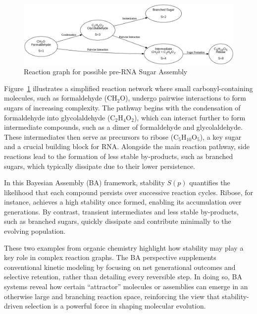 \documentclass[entropy,article,submit,pdftex,moreauthors]{Definitions/mdpi}
\begin{document}
\begin{figure}[h]
    \centering
    \includegraphics[width=1\textwidth,height=0.4\textwidth]{abc_prerna.png}
    \caption{Reaction graph for possible pre-RNA Sugar Assembly}
    \label{fig:abc_prerna}
\end{figure}

Figure~\ref{fig:abc_prerna} illustrates a simplified reaction network where small carbonyl-containing molecules, such as formaldehyde (CH$_2$O), undergo pairwise interactions to form sugars of increasing complexity. The pathway begins with the condensation of formaldehyde into glycolaldehyde (C$_2$H$_4$O$_2$), which can interact further to form intermediate compounds, such as a dimer of formaldehyde and glycolaldehyde. These intermediates then serve as precursors to ribose (C$_5$H$_{10}$O$_5$), a key sugar and a crucial building block for RNA. Alongside the main reaction pathway, side reactions lead to the formation of less stable by-products, such as branched sugars, which typically dissipate due to their lower persistence.

In this Bayesian Assembly (BA) framework, stability $S(p)$ quantifies the likelihood that each compound persists over successive reaction cycles. Ribose, for instance, achieves a high stability once formed, enabling its accumulation over generations. By contrast, transient intermediates and less stable by-products, such as branched sugars, quickly dissipate and contribute minimally to the evolving population. 

These two examples from organic chemistry highlight how stability may play a key role in complex reaction graphs. The BA perspective supplements conventional kinetic modeling by focusing on net generational outcomes and selective retention, rather than detailing every reversible step. In doing so, BA systems reveal how certain ``attractor'' molecules or assemblies can emerge in an otherwise large and branching reaction space, reinforcing the view that stability-driven selection is a powerful force in shaping molecular evolution.
\end{document}
